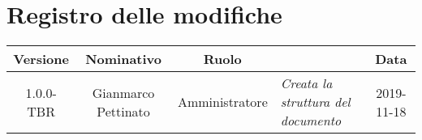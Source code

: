 \section*{Registro delle modifiche}
\renewcommand{\arraystretch}{1.8}

  \begin{longtable}{|c|c|c|p{3.8cm}|c|}
    \hline

    \rowcolor{header}
    \textbf{Versione} & \textbf{Nominativo} & \textbf{Ruolo} & \centering{\textbf{Descrizione}} & \textbf{Data}\\

    \hline

    1.0.0-TBR & Gianmarco Pettinato & Amministratore & \small{\textit{Creata la struttura del documento}} & 2019-11-18\\

    \hline
  \end{longtable}
